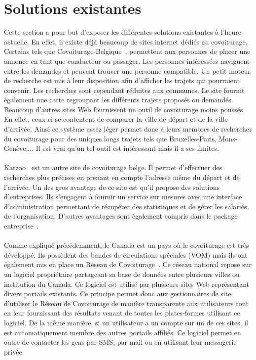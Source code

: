\documentclass[12pt, a4paper, oneside]{article}
\begin{document}
\section{Solutions existantes}
    Cette section a pour but d'exposer les différentes solutions existantes à l'heure actuelle. En effet, il existe déjà beaucoup de sites internet dédiés au covoiturage. Certains tels que Covoiturage-Belgique~\cite{covoiturage-belgique}, permettent aux personnes de placer une annonce en tant que conducteur ou passager. Les personnes intéressées naviguent entre les demandes et peuvent trouver une personne compatible. Un petit moteur de recherche est mis à leur disposition afin d'afficher les trajets qui pourraient convenir. Les recherches sont cependant réduites aux communes. Le site fournit également une carte regroupant les différents trajets proposés ou demandés. Beaucoup d'autres sites Web fournissent un outil de covoiturage moins poussés. En effet, ceux-ci se contentent de comparer la ville de départ et de la ville d'arrivée. Ainsi ce système assez léger permet donc à leurs membres de rechercher du covoiturage pour des uniques longs trajets tels que Bruxelles-Paris, Mons-Genève,... Il est vrai qu'un tel outil est intéressant mais il a ses limites.\\\\
    \indent Karzoo~\cite{karzoo.be} est un autre site de covoiturage belge. Il permet d'effectuer des recherches plus précises en prenant en compte l'adresse même du départ et de l'arrivée. Un des gros avantage de ce site est qu'il propose des solutions d'entreprises. Ils s'engagent à fournir un service sur mesures avec une interface d'administration permettant de récupérer des statistiques et de gérer les salariés de l'organisation. D'autres avantages sont également compris dans le package entreprise~\cite{karzoo.be-entreprise}.\\\\
    \indent Comme expliqué précédemment, le Canada est un pays où le covoiturage est très développé. Ils possèdent des bandes de circulations spéciales (VOM) mais ils ont également mis en place un Réseau de Covoiturage~\cite{covoiturage.ca}. Ce réseau national repose sur un logiciel propriétaire partageant sa base de données entre plusieurs villes ou institution du Canada. Ce logiciel est utilisé par plusieurs sites Web représentant divers portails existants. Ce principe permet donc aux gestionnaires de site d'utiliser le Réseau de Covoiturage de manière transparente aux utilisateurs tout en leur fournissant des résultats venant de toutes les plates-formes utilisant ce logiciel. De la même manière, si un utilisateur a un compte sur un de ces sites, il est automatiquement membre des autres portails affiliés. Ce logiciel permet en outre de contacter les gens par SMS, par mail ou en utilisant leur messagerie privée.\\\\
\end{document}
